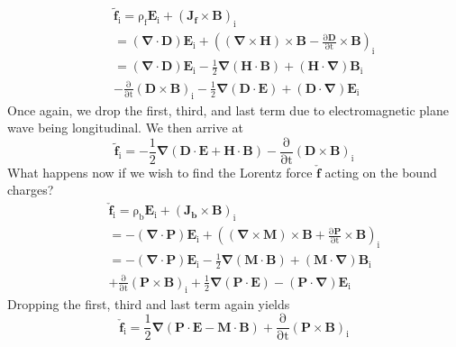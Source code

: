 \begin{eqnarray}
&&\mathrm{\tilde{\mathbf{f}}_i=\rho_f \mathbf{E}_i+\left(\mathbf{J_f} \times \mathbf{B}\right)_i}\nonumber \\
&&=\mathrm{\left(\mathbf{\nabla} \cdot \mathbf{D}\right)\mathbf{E}_i+\left(\left(\mathbf{\nabla}\times \mathbf{H}\right)\times\mathbf{B}-\frac{\partial \mathbf{D}}{\partial t} \times \mathbf{B}\right)_i} \nonumber \\
&&\mathrm{=\left(\mathbf{\nabla} \cdot \mathbf{D}\right)\mathbf{E}_i-\frac{1}{2}\mathbf{\nabla}\left(\mathbf{H}\cdot\mathbf{B}\right)+\left(\mathbf{H}\cdot\mathbf{\nabla}\right)\mathbf{B}_i} \nonumber \\
&&\mathrm{-\frac{\partial}{\partial t} \left(\mathbf{D}\times \mathbf{B}\right)_i-\frac{1}{2}\mathbf{\nabla}\left(\mathbf{D}\cdot\mathbf{E}\right)+\left(\mathbf{D}\cdot\mathbf{\nabla}\right)\mathbf{E}_i}
\end{eqnarray}
Once again, we drop the first, third, and last term due to electromagnetic plane wave being longitudinal.  We then arrive at
\begin{equation}
\mathrm{\tilde{\mathbf{f}}_i=-\frac{1}{2}\mathbf{\nabla}\left(\mathbf{D}\cdot\mathbf{E}+\mathbf{H}\cdot\mathbf{B}\right)-\frac{\partial}{\partial t} \left(\mathbf{D}\times \mathbf{B}\right)_i}
\label{freeforce}
\end{equation}
What happens now if we wish to find the Lorentz force $\check{\mathbf{f}}$ acting on the bound charges?  
\begin{eqnarray}
&&\mathrm{\check{\mathbf{f}}_i=\rho_b \mathbf{E}_i+\left(\mathbf{J_b} \times \mathbf{B}\right)_i}\nonumber \\
&&=-\mathrm{\left(\mathbf{\nabla} \cdot \mathbf{P}\right)\mathbf{E}_i+\left(\left(\mathbf{\nabla}\times \mathbf{M}\right)\times\mathbf{B}+\frac{\partial \mathbf{P}}{\partial t} \times \mathbf{B}\right)_i} \nonumber \\
&&\mathrm{=-\left(\mathbf{\nabla} \cdot \mathbf{P}\right)\mathbf{E}_i-\frac{1}{2}\mathbf{\nabla}\left(\mathbf{M}\cdot\mathbf{B}\right)+\left(\mathbf{M}\cdot\mathbf{\nabla}\right)\mathbf{B}_i} \nonumber \\
&&\mathrm{+\frac{\partial}{\partial t} \left(\mathbf{P}\times \mathbf{B}\right)_i+\frac{1}{2}\mathbf{\nabla}\left(\mathbf{P}\cdot\mathbf{E}\right)-\left(\mathbf{P}\cdot\mathbf{\nabla}\right)\mathbf{E}_i}
\end{eqnarray}
Dropping the first, third and last term again yields
\begin{equation}
\mathrm{\check{\mathbf{f}}_i=\frac{1}{2}\mathbf{\nabla}\left(\mathbf{P}\cdot\mathbf{E}-\mathbf{M}\cdot\mathbf{B}\right)+\frac{\partial}{\partial t} \left(\mathbf{P}\times \mathbf{B}\right)_i}
\label{boundforce}
\end{equation}
